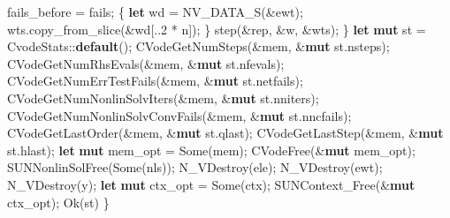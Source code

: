 \documentclass[
  10pt,
]{article}
\newenvironment{Shaded}{}{}
\newcommand{\ConstantTok}[1]{\textcolor[rgb]{0.53,0.00,0.00}{#1}}
\newcommand{\DecValTok}[1]{\textcolor[rgb]{0.25,0.63,0.44}{#1}}
\newcommand{\KeywordTok}[1]{\textcolor[rgb]{0.00,0.44,0.13}{\textbf{#1}}}
\newcommand{\NormalTok}[1]{#1}
\newcommand{\OperatorTok}[1]{\textcolor[rgb]{0.40,0.40,0.40}{#1}}
\newcommand{\PreprocessorTok}[1]{\textcolor[rgb]{0.74,0.48,0.00}{#1}}
\begin{document}
\begin{Shaded}
\begin{Highlighting}[]
\NormalTok{        fails\_before }\OperatorTok{=}\NormalTok{ fails}\OperatorTok{;}
        \OperatorTok{\{}
            \KeywordTok{let}\NormalTok{ wd }\OperatorTok{=}\NormalTok{ NV\_DATA\_S(}\OperatorTok{\&}\NormalTok{ewt)}\OperatorTok{;}
\NormalTok{            wts}\OperatorTok{.}\NormalTok{copy\_from\_slice(}\OperatorTok{\&}\NormalTok{wd[}\OperatorTok{..}\DecValTok{2} \OperatorTok{*}\NormalTok{ n])}\OperatorTok{;}
        \OperatorTok{\}}
\NormalTok{        step(}\OperatorTok{\&}\NormalTok{rep}\OperatorTok{,} \OperatorTok{\&}\NormalTok{w}\OperatorTok{,} \OperatorTok{\&}\NormalTok{wts)}\OperatorTok{;}
    \OperatorTok{\}}
    \KeywordTok{let} \KeywordTok{mut}\NormalTok{ st }\OperatorTok{=} \PreprocessorTok{CvodeStats::}\KeywordTok{default}\NormalTok{()}\OperatorTok{;}
\NormalTok{    CVodeGetNumSteps(}\OperatorTok{\&}\NormalTok{mem}\OperatorTok{,} \OperatorTok{\&}\KeywordTok{mut}\NormalTok{ st}\OperatorTok{.}\NormalTok{nsteps)}\OperatorTok{;}
\NormalTok{    CVodeGetNumRhsEvals(}\OperatorTok{\&}\NormalTok{mem}\OperatorTok{,} \OperatorTok{\&}\KeywordTok{mut}\NormalTok{ st}\OperatorTok{.}\NormalTok{nfevals)}\OperatorTok{;}
\NormalTok{    CVodeGetNumErrTestFails(}\OperatorTok{\&}\NormalTok{mem}\OperatorTok{,} \OperatorTok{\&}\KeywordTok{mut}\NormalTok{ st}\OperatorTok{.}\NormalTok{netfails)}\OperatorTok{;}
\NormalTok{    CVodeGetNumNonlinSolvIters(}\OperatorTok{\&}\NormalTok{mem}\OperatorTok{,} \OperatorTok{\&}\KeywordTok{mut}\NormalTok{ st}\OperatorTok{.}\NormalTok{nniters)}\OperatorTok{;}
\NormalTok{    CVodeGetNumNonlinSolvConvFails(}\OperatorTok{\&}\NormalTok{mem}\OperatorTok{,} \OperatorTok{\&}\KeywordTok{mut}\NormalTok{ st}\OperatorTok{.}\NormalTok{nncfails)}\OperatorTok{;}
\NormalTok{    CVodeGetLastOrder(}\OperatorTok{\&}\NormalTok{mem}\OperatorTok{,} \OperatorTok{\&}\KeywordTok{mut}\NormalTok{ st}\OperatorTok{.}\NormalTok{qlast)}\OperatorTok{;}
\NormalTok{    CVodeGetLastStep(}\OperatorTok{\&}\NormalTok{mem}\OperatorTok{,} \OperatorTok{\&}\KeywordTok{mut}\NormalTok{ st}\OperatorTok{.}\NormalTok{hlast)}\OperatorTok{;}
    \KeywordTok{let} \KeywordTok{mut}\NormalTok{ mem\_opt }\OperatorTok{=} \ConstantTok{Some}\NormalTok{(mem)}\OperatorTok{;}
\NormalTok{    CVodeFree(}\OperatorTok{\&}\KeywordTok{mut}\NormalTok{ mem\_opt)}\OperatorTok{;}
\NormalTok{    SUNNonlinSolFree(}\ConstantTok{Some}\NormalTok{(nls))}\OperatorTok{;}
\NormalTok{    N\_VDestroy(ele)}\OperatorTok{;}
\NormalTok{    N\_VDestroy(ewt)}\OperatorTok{;}
\NormalTok{    N\_VDestroy(y)}\OperatorTok{;}
    \KeywordTok{let} \KeywordTok{mut}\NormalTok{ ctx\_opt }\OperatorTok{=} \ConstantTok{Some}\NormalTok{(ctx)}\OperatorTok{;}
\NormalTok{    SUNContext\_Free(}\OperatorTok{\&}\KeywordTok{mut}\NormalTok{ ctx\_opt)}\OperatorTok{;}
    \ConstantTok{Ok}\NormalTok{(st)}
\OperatorTok{\}}


\end{Highlighting}
\end{Shaded}
\end{document}
